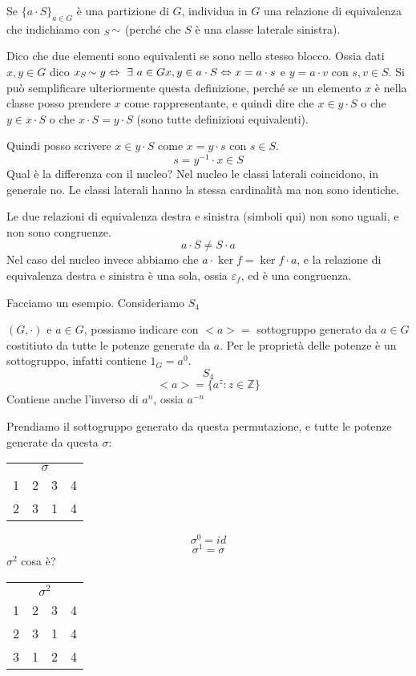 Se $\{a \cdot S\}_{a \in G}$ \`e una partizione di $G$, individua in $G$ una relazione di equivalenza che indichiamo con ${}_{S}\!\sim$ (perch\'e che $S$ \`e una classe laterale sinistra).

Dico che due elementi sono equivalenti se sono nello stesso blocco. Ossia dati $x, y \in G$ dico $x \lateralsx{S} y \Leftrightarrow \exists a \in G x, y \in a \cdot S \Leftrightarrow x = a \cdot s$ e $y = a \cdot v$ con $s, v \in S$. Si pu\`o semplificare ulteriormente questa definizione, perch\'e se un elemento $x$ \`e nella classe posso prendere $x$ come rappresentante, e quindi dire che $x \in y \cdot S$ o che $y \in x \cdot S$ o che $x \cdot S = y \cdot S$ (sono tutte definizioni equivalenti).

Quindi posso scrivere $x \in y \cdot S$ come $x = y \cdot s$ con $s \in S$.
\[
s = y^{-1} \cdot x \in S
\]
Qual \`e la differenza con il nucleo? Nel nucleo le classi laterali coincidono, in generale no. Le classi laterali hanno la stessa cardinalit\`a ma non sono identiche.

Le due relazioni di equivalenza destra e sinistra (simboli qui) non sono uguali, e non sono congruenze.
\[
a \cdot S \neq S \cdot a
\]
Nel caso del nucleo invece abbiamo che $a \cdot \ker f = \ker f \cdot a$, e la relazione di equivalenza destra e sinistra \`e una sola, ossia $\varepsilon_f$, ed \`e una congruenza.

Facciamo un esempio. Consideriamo $S_4$

$(G, \cdot)$ e $a \in G$, possiamo indicare con $< a > =$ sottogruppo generato da $a \in G$ costitiuto da tutte le potenze generate da $a$. Per le propriet\`a delle potenze \`e un sottogruppo, infatti contiene $1_G = a^{0}$.
\[
S_4
\]
\[
< a > = \{ a^{z} : z \in \mathbb{Z} \}
\]
Contiene anche l'inverso di $a^{n}$, ossia $a^{-n}$

Prendiamo il sottogruppo generato da questa permutazione, e tutte le potenze generate da questa $\sigma$:

\begin{tabular}{cccc}
\multicolumn{4}{c}{$\sigma$} \\
1 & 2 & 3 & 4 \\
2 & 3 & 1 & 4 
\end{tabular}

\[
\sigma^{0} = id
\]
\[
\sigma^{1} = \sigma
\]
$\sigma^{2}$ cosa \`e?

\begin{tabular}{cccc}
\multicolumn{4}{c}{$\sigma^{2}$} \\
1 & 2 & 3 & 4 \\
2 & 3 & 1 & 4 \\
3 & 1 & 2 & 4
\end{tabular}

